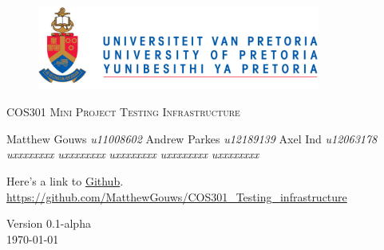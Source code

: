 \begin{titlepage}
	\begin{center}
		
		\begin{figure}[t]
			\centering
			\includegraphics[width=350px]{UP_Logo.png}
		\end{figure}
		
		\textsc{\LARGE COS301 Mini Project Testing \newline\newline Infrastructure}
		
		\begin{flushright} \large
			Matthew Gouws \emph{u11008602} \newline
			Andrew Parkes \emph{u12189139} \newline
			 Axel Ind \emph{u12063178} \newline
			 \emph{uxxxxxxxx} \newline
			 \emph{uxxxxxxxx} \newline
			 \emph{uxxxxxxxx} \newline
			 \emph{uxxxxxxxx} \newline
			 \emph{uxxxxxxxx} \newline
		\end{flushright}
		
		\vfill
		
	Here's a link to \href{https://github.com/MatthewGouws/COS301_Testing_infrastructure}{Github}.\\
	\url{https://github.com/MatthewGouws/COS301_Testing_infrastructure}

	\vfill

	{\large Version 0.1-alpha}
	\\
	{\large \today}		
		
		
	\end{center}
\end{titlepage}
